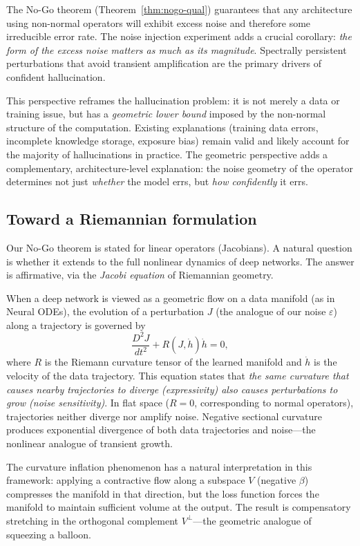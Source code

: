 \documentclass[11pt,a4paper]{article}
\theoremstyle{definition}
\begin{document}
The No-Go theorem (Theorem~\ref{thm:nogo-qual}) guarantees that
any architecture using non-normal operators will exhibit excess noise
and therefore some irreducible error rate. The noise injection
experiment adds a crucial corollary: \emph{the form of the excess
noise matters as much as its magnitude}. Spectrally persistent
perturbations that avoid transient amplification are the primary
drivers of confident hallucination.

This perspective reframes the hallucination problem: it is not
merely a data or training issue, but has a \emph{geometric lower
bound} imposed by the non-normal structure of the computation.
Existing explanations (training data errors, incomplete knowledge
storage, exposure bias) remain valid and likely account for the
majority of hallucinations in practice. The geometric perspective
adds a complementary, architecture-level explanation: the noise
geometry of the operator determines not just \emph{whether} the
model errs, but \emph{how confidently} it errs.

\subsection{Toward a Riemannian formulation}

Our No-Go theorem is stated for linear operators (Jacobians). A
natural question is whether it extends to the full nonlinear
dynamics of deep networks. The answer is affirmative, via the
\emph{Jacobi equation} of Riemannian geometry.

When a deep network is viewed as a geometric flow on a data
manifold (as in Neural ODEs), the evolution of a perturbation
$J$ (the analogue of our noise $\varepsilon$) along a trajectory
is governed by
\[
  \frac{D^2 J}{dt^2} + R(J, \dot{h})\dot{h} = 0,
\]
where $R$ is the Riemann curvature tensor of the learned manifold
and $\dot{h}$ is the velocity of the data trajectory. This equation
states that \emph{the same curvature that causes nearby trajectories
to diverge (expressivity) also causes perturbations to grow
(noise sensitivity)}. In flat space ($R = 0$, corresponding to
normal operators), trajectories neither diverge nor amplify noise.
Negative sectional curvature produces exponential divergence of
both data trajectories and noise---the nonlinear analogue of
transient growth.

The curvature inflation phenomenon has a natural interpretation
in this framework: applying a contractive flow along a subspace
$V$ (negative $\beta$) compresses the manifold in that direction,
but the loss function forces the manifold to maintain sufficient
volume at the output. The result is compensatory stretching
in the orthogonal complement $V^\perp$---the geometric analogue
of squeezing a balloon.
\end{document}
